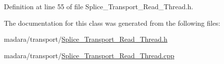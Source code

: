 Definition at line 55 of file Splice\_\-Transport\_\-Read\_\-Thread.h.



The documentation for this class was generated from the following files:\begin{DoxyCompactItemize}
\item 
madara/transport/\hyperlink{Splice__Transport__Read__Thread_8h}{Splice\_\-Transport\_\-Read\_\-Thread.h}\item 
madara/transport/\hyperlink{Splice__Transport__Read__Thread_8cpp}{Splice\_\-Transport\_\-Read\_\-Thread.cpp}\end{DoxyCompactItemize}

